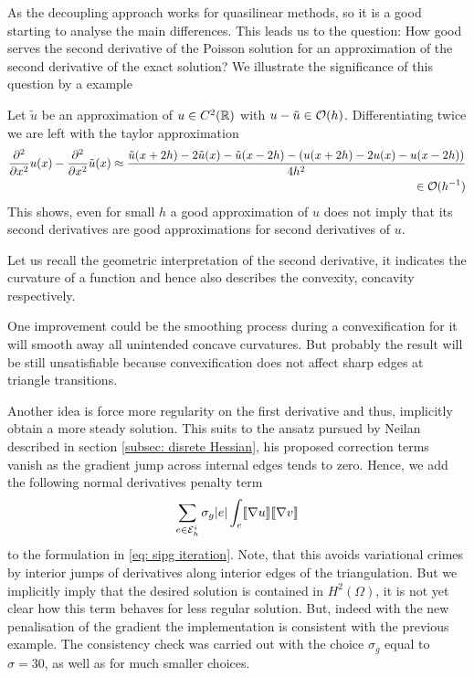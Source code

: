 As the decoupling approach works for quasilinear methods, so it is a good starting to analyse the main differences. This leads us to the question: How good serves the second derivative of the Poisson solution for an approximation of the second derivative of the exact solution?
We illustrate the significance of this question by a example
\begin{example}
	Let $\tilde u$ be an approximation of $u\in C^2(\mathbb{R})$ with $u-\tilde u \in \mathcal{O}(h)$. 
	Differentiating twice we are left with the taylor approximation
	\begin{align*}
		\frac {\partial^2} {\partial {x}^2} u(x)-\frac {\partial^2} {\partial {x}^2} \tilde u(x) \approx \frac{\tilde u(x+2h) - 2\tilde u(x) - \tilde u(x-2h) - (u(x+2h) - 2u(x) - u(x-2h))} {4h^2} \\
		 \in \mathcal{O}(h^{-1})
	\end{align*}
	This shows, even for small $h$ a good approximation of $u$ does not imply that its second derivatives are good approximations for second derivatives of $u$.
\end{example}

Let us recall the geometric interpretation of the second derivative, it indicates the curvature of a function and hence also describes the convexity, concavity respectively.

One improvement could be the smoothing process during a convexification for it will smooth away all unintended concave curvatures. But probably the result will be still unsatisfiable because convexification does not affect sharp edges at triangle transitions.

Another idea is force more regularity on the first derivative and thus, implicitly obtain a more steady solution. This suits to the ansatz pursued by Neilan described in section \ref{subsec: disrete Hessian}, his proposed correction terms vanish as the gradient jump across internal edges tends to zero.
Hence, we add the following normal derivatives penalty term 
\begin{align}
	\sum_{e \in \mathcal{E}_h^i} \sigma_g |e |\int_e \llbracket  \nabla u \rrbracket \llbracket \nabla v \rrbracket \label{eq: grad penalty term}
\end{align}
to the formulation in \eqref{eq: sipg iteration}.
Note, that this avoids variational crimes by interior jumps of derivatives along interior edges of the triangulation. But we implicitly imply that the desired solution is contained in $H^2(\Omega)$, it is not yet clear how this term behaves for less regular solution.
But, indeed with the new penalisation of the gradient the implementation is consistent with the previous example. The consistency check was carried out with the choice $\sigma_g$ equal to $\sigma=30$, as well as for much smaller choices.

